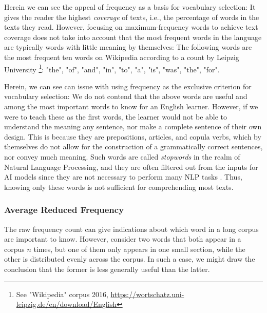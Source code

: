 Herein we can see the appeal of frequency as a basis for vocabulary selection:
It gives the reader the highest \textit{coverage} of texts, i.e., the percentage of words in the texts they read.
However, focusing on maximum-frequency words to achieve text coverage does not take into account that the most frequent words in the language are typically words with little meaning by themselves:
The following words are the most frequent ten words on Wikipedia according to a count by Leipzig University \footnote{See "Wikipedia" corpus 2016, \url{https://wortschatz.uni-leipzig.de/en/download/English}}:
"the", "of", "and", "in", "to", "a", "is", "was", "the", "for".

Herein, we can see can issue with using frequency as the exclusive criterion for vocabulary selection:
We do not contend that the above words are useful and among the most important words to know for an English learner.
However, if we were to teach these as the first words, the learner would not be able to understand the meaning any sentence, nor make a complete sentence of their own design.
This is because they are prepositions, articles, and copula verbs, which by themselves do not allow for the construction of a grammatically correct sentences, nor convey much meaning.
Such words are called \textit{stopwords} in the realm of Natural Language Processing, and they are often filtered out from the inputs for AI models since they are not necessary to perform many NLP tasks .
Thus, knowing only these words is not sufficient for comprehending most texts.


%

\subsubsection {Average Reduced Frequency}
The raw frequency count can give indications about which word in a long corpus are important to know.
However, consider two words that both appear in a corpus $n$ times, but one of them only appears in one small section, while the other is distributed evenly across the corpus.
In such a case, we might draw the conclusion that the former is less generally useful than the latter.

